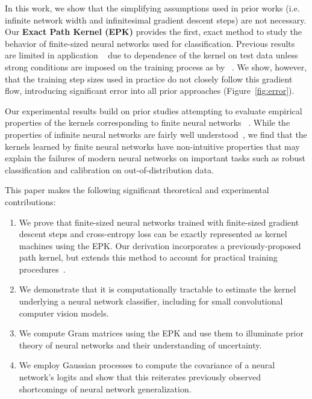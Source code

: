 In this work, we show that the simplifying assumptions used in prior works (i.e. infinite network width and infinitesimal gradient descent steps) are not necessary. Our \textbf{Exact Path Kernel (EPK)} provides the first, exact method to study the behavior of finite-sized neural networks used for classification.
Previous results are limited in application ~\cite{incudini2022quantum} due to dependence of the kernel on test data unless strong conditions are imposed on the training process as by ~\cite{chen2021equivalence}. We show, however, that the training step sizes used in practice do not closely follow this gradient flow, introducing significant error into all prior approaches (Figure~\ref{fig:error}).

Our experimental results build on prior studies attempting to evaluate empirical properties of the kernels corresponding to finite neural networks ~\cite{DBLP:conf/iclr/LeeBNSPS18, chen2021equivalence}. While the properties of infinite neural networks are fairly well understood~\cite{neal1996priors}, we find that the kernels learned by finite neural networks have non-intuitive properties that may explain the failures of modern neural networks on important tasks such as robust classification and calibration on out-of-distribution data.

This paper makes the following significant theoretical and experimental contributions:
\begin{enumerate}
    \item We prove that finite-sized neural networks trained with finite-sized gradient descent steps and cross-entropy loss can be exactly represented as kernel machines using the EPK. Our derivation incorporates a previously-proposed path kernel, but extends this method to account for practical training procedures~\cite{domingos2020every, chen2021equivalence}.
  
    \item We demonstrate that it is computationally tractable to estimate the kernel underlying a neural network classifier, including for small convolutional computer vision models.
    \item We compute Gram matrices using the EPK and use them to illuminate prior theory of neural networks and their understanding of uncertainty. 
    \item We employ Gaussian processes to compute the covariance of a neural network's logits and show that this reiterates previously observed shortcomings of neural network generalization.
\end{enumerate}

